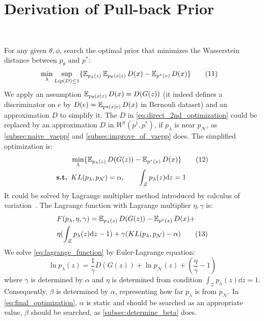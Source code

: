 \section{Derivation of Pull-back Prior}~\label{subsec:inference}

For any given $\theta, \phi$, search the optimal prior that minimizes the Wasserstein distance between $p_\theta$ and $p^*$:
\begin{align*}\label{eq:direct_2nd_optimization}
	& \min_{\lambda} \sup_{Lip(D) \leq 1} \{\operatorname{\mathbb{E}}_{p_\lambda(z)} \operatorname{\mathbb{E}}_{p_\theta(x|z)} D(x)  - \operatorname{\mathbb{E}}_{p^*(x)} D(x)\} 
	\tag{11}
\end{align*}
We apply an assumption $\operatorname{\mathbb{E}}_{p_\theta(x|z)} D(x) = D(G(z))$ (it indeed defines a discriminator on $e$ by $D(e) = \operatorname{\mathbb{E}}_{p*(x|e)} D(x)$ in Bernouli  dataset) and an approximation $D$ to simplify it. The $D$ in \cref{eq:direct_2nd_optimization} could be replaced by an approximation $D$ in $W^1(p^\dag, p^*)$, if $p_\lambda$ is near $p_\mathcal{N}$, as \cref{subsec:naive_vaepp} and \cref{subsec:improve_of_vaepp} does. The simplified optimization is:
\begin{align*}\label{eq:final_optimization}
	& \min_{\lambda} \{\operatorname{\mathbb{E}}_{p_\lambda(z)} D(G(z))  - \operatorname{\mathbb{E}}_{p^*(x)} D(x)\} \tag{12} \\
	{\textbf{s.t. }} & KL(p_\lambda, p_\mathcal{N}) = \alpha, \qquad \int_{\mathcal{Z}} p_\lambda(z) \mathrm{d} z = 1
\end{align*}
It could be solved by Lagrange multiplier method introduced by calculus of variation~\cite{gelfand2000calculus}. The Lagrange function with Lagrange multiplier $\eta, \gamma$ is:
\begin{align*}\label{eq:lagrange_function}
& F(p_\lambda, \eta, \gamma) = \operatorname{\mathbb{E}}_{p_\lambda(z)} D(G(z))  - \operatorname{\mathbb{E}}_{p^*(x)} D(x) + \\
& \eta (\int_{\mathcal{Z}} p_\lambda(z) \mathrm{d} z - 1) + \gamma(KL(p_\lambda, p_\mathcal{N}) - \alpha) \tag{13}
\end{align*}
We solve \cref{eq:lagrange_function} by Euler-Lagrange equation:
\begin{equation*}\label{eq:euler_lagrange_eqaution}
	\ln p_\lambda(z) = \frac{1}{\gamma} D(G(z)) + \ln p_\mathcal{N}(z) + (\frac{\eta}{\gamma} - 1) \tag{14}
\end{equation*}
where $\gamma$ is determined by $\alpha$ and $\eta$ is determined from condition $\int_{\mathcal{Z}} p_\lambda(z) \dd z = 1$.
Consequently, $\beta$ is determined by $\alpha$, representing how far $p_\lambda$ is from $p_\mathcal{N}$. In \cref{eq:final_optimization}, $\alpha$ is static and should be searched as an appropriate value, \IE $\beta$ should be searched, as \cref{subsec:determine_beta} does. 
 
 